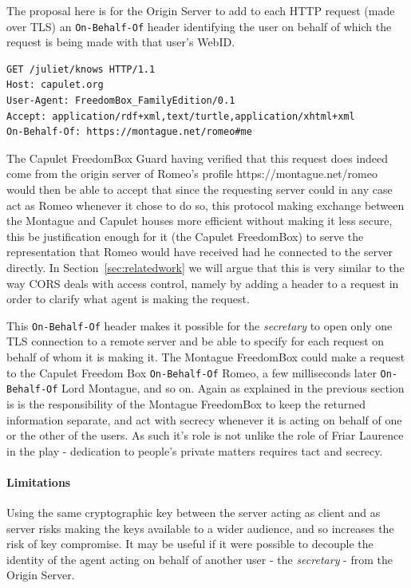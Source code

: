 \documentclass[a4paper]{llncs}
\begin{document}
The proposal here is for the Origin Server to add to each HTTP request (made over TLS) an \lstinline|On-Behalf-Of| header identifying the user on behalf of which the request is being made with that user's WebID.

\begin{verbatim}
GET /juliet/knows HTTP/1.1
Host: capulet.org
User-Agent: FreedomBox_FamilyEdition/0.1 
Accept: application/rdf+xml,text/turtle,application/xhtml+xml
On-Behalf-Of: https://montague.net/romeo#me
\end{verbatim}

The Capulet FreedomBox Guard having verified that this request does indeed come from the origin server of Romeo's profile
https://montague.net/romeo would then be able to accept that since the requesting server could in any case act as Romeo whenever it chose to do so, this protocol making exchange between the Montague and Capulet houses more efficient without making it less secure, this be justification enough for it (the Capulet FreedomBox) to  serve the representation that Romeo would have received had he connected to the server directly.  
In Section~\ref{sec:relatedwork} we will argue that this is very similar to the way CORS deals with access control, namely by adding a header to a request in order to clarify what agent is making the request.

This \lstinline|On-Behalf-Of| header makes it possible for the \textit{secretary} to open only one TLS connection to a remote server and be 
able to specify for each request on behalf of whom it is making it. The Montague FreedomBox could make a request to the Capulet Freedom Box \lstinline|On-Behalf-Of| Romeo, a few milliseconds later \lstinline|On-Behalf-Of| Lord Montague, and so on. 
Again as explained in the previous section is is the responsibility of the Montague FreedomBox to keep the returned information separate, and act with secrecy whenever it is acting on behalf of one or the other of the users. 
As such it's role is not unlike the role of Friar Laurence in the play - dedication to people's private matters requires tact and secrecy.

\paragraph{Limitations}

Using the same cryptographic key between the server acting as client and as server risks making the keys available to a wider audience, and so increases the risk of key compromise. 
It may be useful if it were possible to decouple the identity of the agent acting on behalf of another user - the \textit{secretary} - from the Origin Server.
\end{document}
